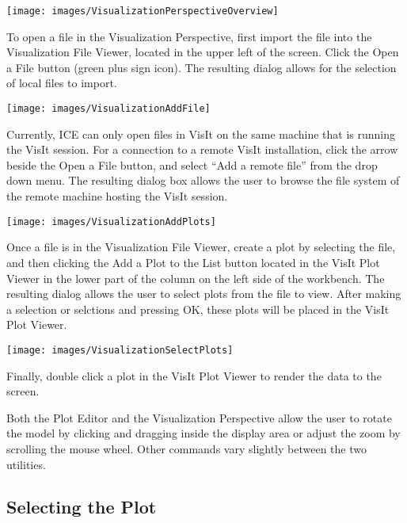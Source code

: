 \begin{center}
\texttt{[image: images/VisualizationPerspectiveOverview]}
\end{center}

To open a file in the Visualization Perspective, first import the file into the
Visualization File Viewer, located in the upper left of the screen. Click the
Open a File button (green plus sign icon). The resulting dialog allows for the
selection of local files to import.

\begin{center}
\texttt{[image: images/VisualizationAddFile]}
\end{center}

Currently, ICE can only open files in VisIt on the same machine that is running
the VisIt session. For a connection to a remote VisIt installation, click the
arrow beside the Open a File button, and select ``Add a remote file'' from the
drop down menu. The resulting dialog box allows the user to browse the file
system of the remote machine hosting the VisIt session.

\begin{center}
\texttt{[image: images/VisualizationAddPlots]}
\end{center}

Once a file is in the Visualization File Viewer, create a plot by selecting the
file, and then clicking the Add a Plot to the List button located in the VisIt
Plot Viewer in the lower part of the column on the left side of the workbench.
The resulting dialog allows the user to select plots from the file to view.
After making a selection or selctions and pressing OK, these plots will be
placed in the VisIt Plot Viewer.

\begin{center}
\texttt{[image: images/VisualizationSelectPlots]}
\end{center}

Finally, double click a plot in the VisIt Plot Viewer to render the data to the
screen.

Both the Plot Editor and the Visualization Perspective allow the user to rotate
the model by clicking and dragging inside the display area or adjust the zoom by
scrolling the mouse wheel. Other commands vary slightly between the two
utilities.

\subsection{Selecting the Plot}

